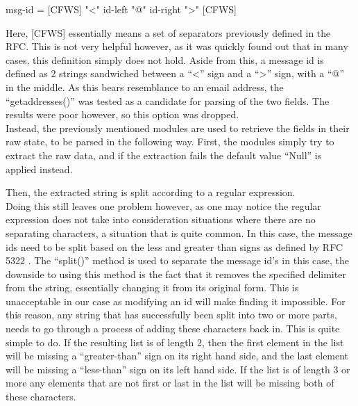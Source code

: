 \documentclass[a4paper,english]{report}
\begin{document}
\begin{center}

	 msg-id          =   [CFWS] "<" id-left "@" id-right ">" [CFWS]

\end{center}


Here, [CFWS] essentially means a set of separators previously defined in the RFC. This is not very helpful however, as it was quickly found out that in many cases, this definition simply does not hold. Aside from this, a message id is defined as 2 strings sandwiched between a “<” sign and a “>” sign, with a “@” in the middle. As this bears resemblance to an email address, the “getaddresses()” was tested as a candidate for parsing of the two fields. The results were poor however, so this option was dropped.\\

Instead, the previously mentioned modules are used to retrieve the fields in their raw state, to be parsed in the following way.
First, the modules simply try to extract the raw data, and if the extraction fails the default value “Null” is applied instead. 




Then, the extracted string is split according to a regular expression.\\



Doing this still leaves one problem however, as one may notice the regular expression does not take into consideration situations where there are no separating characters, a situation that is quite common. In this case, the message ids need to be split based on the less and greater than signs as defined by RFC 5322 \cite{RFC5322}. 
The “split()” method is used to separate the message id’s in this case, the downside to using this method is the fact that it removes the specified delimiter from the string, essentially changing it from its original form. This is unacceptable in our case as modifying an id will make finding it impossible. For this reason, any string that has successfully been split into two or more parts, needs to go through a process of adding these characters back in.
This is quite simple to do. If the resulting list is of length 2, then the first element in the list will be missing a “greater-than” sign on its right hand side, and the last element will be missing a “less-than” sign on its left hand side. If the list is of length 3 or more any elements that are not first or last in the list will be missing both of these characters.
\end{document}
